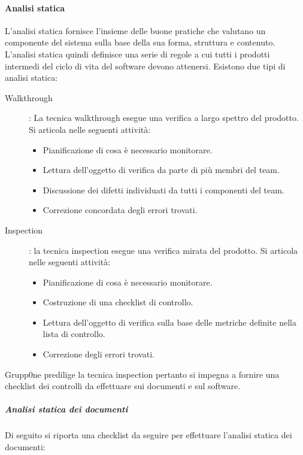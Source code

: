 \documentclass[../norme-di-progetto.tex]{subfiles}
\begin{document}
\paragraph{Analisi statica}%
\label{par:analisi statica}
L'analisi statica fornisce l'insieme delle buone pratiche che valutano un componente del sistema sulla base della sua forma, struttura e contenuto. L'analisi statica quindi definisce una serie di regole  a cui tutti i prodotti intermedi del ciclo di vita del software devono attenersi. Esistono due tipi di analisi statica:
\begin{description}
  \item [Walkthrough]: La tecnica walkthrough esegue una verifica a largo spettro del prodotto. Si articola nelle seguenti attività:
  \begin{itemize}
    \item Pianificazione di cosa è necessario monitorare.
    \item Lettura dell'oggetto di verifica da parte di più membri del team.
    \item Discussione dei difetti individuati da tutti i componenti del team.
    \item Correzione concordata degli errori trovati.
  \end{itemize}
  \item [Inspection]: la tecnica inspection esegue una verifica mirata del prodotto. Si articola nelle seguenti attività:
  \begin{itemize}
    \item Pianificazione di cosa è necessario monitorare.
    \item Costruzione di una checklist di controllo.
    \item Lettura dell'oggetto di verifica sulla base delle metriche definite nella lista di controllo.
    \item Correzione degli errori trovati.
  \end{itemize}
\end{description}
Grupp0ne predilige la tecnica inspection pertanto si impegna a fornire una checklist dei controlli da effettuare sui documenti e sul software.

\subparagraph{Analisi statica dei documenti}%
\label{subp:analisi statica dei documenti}
Di seguito si riporta una checklist da seguire per effettuare l'analisi statica dei documenti:
\end{document}
